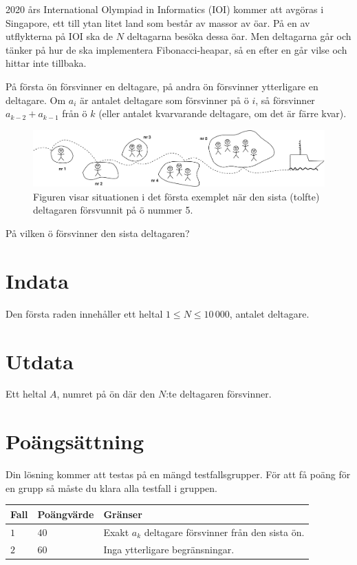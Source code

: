 2020 års International Olympiad in Informatics (IOI) kommer att avgöras i Singapore, ett till ytan litet land som består av massor av öar.
På en av utflykterna på IOI ska de $N$ deltagarna besöka dessa öar.
Men deltagarna går och tänker på hur de ska implementera Fibonacci-heapar, så en efter en går vilse och hittar inte tillbaka.

På första ön försvinner en deltagare, på andra ön försvinner ytterligare en deltagare.
Om $a_i$ är antalet deltagare som försvinner på ö $i$, så försvinner $a_{k-2} + a_{k-1}$ från ö $k$ (eller antalet kvarvarande deltagare, om det är färre kvar).

\begin{figure}[h]
  \centering
      \includegraphics[width=1.0\textwidth]{oarfig}
      \caption{Figuren visar situationen i det första exemplet när den sista (tolfte) deltagaren försvunnit på ö nummer 5.}
\end{figure}

På vilken ö försvinner den sista deltagaren?

\section*{Indata}
Den första raden innehåller ett heltal $1\le N \le 10\,000$, antalet deltagare.

\section*{Utdata}
Ett heltal $A$, numret på ön där den $N$:te deltagaren försvinner.

\section*{Poängsättning}
Din lösning kommer att testas på en mängd testfallsgrupper.
För att få poäng för en grupp så måste du klara alla testfall i gruppen.

\noindent
\begin{tabular}{| l | l | l |}
  \hline
  Fall & Poängvärde & Gränser \\ \hline
  $1$    & $40$        &  Exakt $a_k$ deltagare försvinner från den sista ön. \\ \hline 
  $2$    & $60$        &  Inga ytterligare begränsningar. \\ \hline
\end{tabular}
